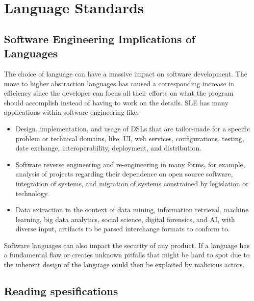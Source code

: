 \documentclass[tikz, border=5mm]{article}
\begin{document}
    \section{Language Standards}
        \subsection{Software Engineering Implications of Languages}
        The choice of language can have a massive impact on software development. The move to higher abstraction languages has caused a corresponding increase in efficiency
        since the developer can focus all their efforts on what the program should accomplish instead of having to work on the details. 
       \gls{SLE} has many applications within software engineering like;
        \begin{itemize}
            \item Design, implementation, and usage of DSLs that are tailor-made for a specific problem or technical domains, like, UI, web services, configurations, testing,
                    date exchange, interoperability, deployment, and distribution.
            \item Software reverse engineering and re-engineering in many forms, for example, analysis of projects regarding their dependence on open source software,
                    integration of systems, and migration of systems constrained by legislation or technology.
            \item Data extraction in the context of data mining, information retrieval, machine learning, big data analytics, social science, digital forensics, and AI, 
                    with diverse input, artifacts to be parsed interchange formats to conform to.
        \end{itemize}
        Software languages can also impact the security of any product. If a language has a fundamental flaw or creates unknown pitfalls that might be hard to spot due to
        the inherent design of the language could then be exploited by malicious actors. 
        \subsection{Reading spesifications}
\end{document}
